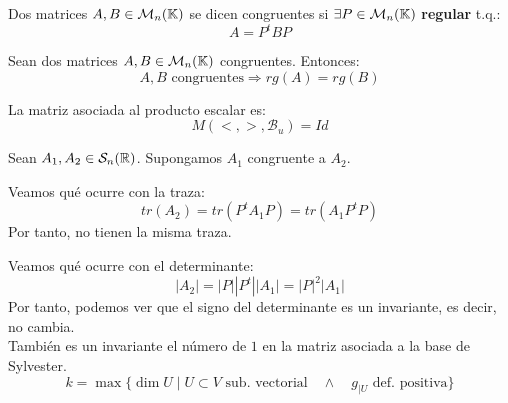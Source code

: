 \begin{definicion} Dos matrices $A,B\in \mathcal{M}_n(\mathbb{K})$ se dicen congruentes si $\exists P\in \mathcal{M}_n(\mathbb{K})$ \textbf{regular} t.q.:
$$A=P^tBP$$
\end{definicion}

\begin{lema}
    Sean dos matrices $A,B\in \mathcal{M}_n(\mathbb{K})$ congruentes. Entonces:
    $$A,B \text{ congruentes} \Longrightarrow rg(A)=rg(B)$$
\end{lema}
\begin{ejemplo}La matriz asociada al producto escalar es:
    $$M(<,>,\mathcal{B}_u) = Id$$
\end{ejemplo}

\begin{observacion}
    Sean $A_1, A_2\in \mathcal{S}_n(\mathbb{R})$. Supongamos $A_1$ congruente a $A_2$.

    Veamos qué ocurre con la traza:
    \begin{equation*}
        tr(A_2) = tr(P^tA_1P) = tr(A_1P^tP)
    \end{equation*}
    Por tanto, no tienen la misma traza.
    
    Veamos qué ocurre con el determinante:
    \begin{equation*}
        |A_2| = |P||P^t||A_1|=|P|^2|A_1|
    \end{equation*}
    Por tanto, podemos ver que el signo del determinante es un invariante, es decir, no cambia.\\
    
    También es un invariante el número de $1$ en la matriz asociada a la base de Sylvester.
    $$k = \max \{\dim U \mid U\subset V \text{ sub. vectorial} \quad \land \quad g_{\left|U \right.} \text{ def. positiva}\}$$
\end{observacion}

